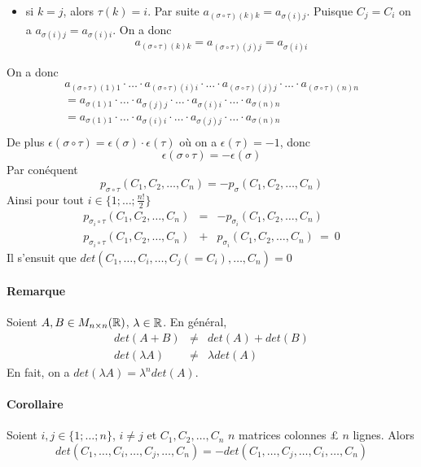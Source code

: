 \begin{enumerate}
\begin{itemize}
      \item si $k = j$, alors $\tau(k) = i$. Par suite $a_{(\sigma \circ \tau)(k) k} = a_{\sigma(i) j}$. Puisque $C_j = C_i$ on a $a_{\sigma(i) j} = a_{\sigma(i) i}$. On a donc
        $$a_{(\sigma \circ \tau)(k) k} = a_{(\sigma \circ \tau)(j) j} = a_{\sigma(i) i}$$
    \end{itemize}
    On a donc
    \begin{eqnarray*}
      a_{(\sigma \circ \tau)(1) 1} \cdot \ldots \cdot a_{(\sigma \circ \tau)(i) i} \cdot \ldots \cdot a_{(\sigma \circ \tau)(j) j} \cdot \ldots \cdot a_{(\sigma \circ \tau)(n) n} \\
        = a_{\sigma(1) 1} \cdot \ldots \cdot a_{\sigma(j) j} \cdot \ldots \cdot a_{\sigma(i) i} \cdot \ldots \cdot a_{\sigma(n) n} \\
        = a_{\sigma(1) 1} \cdot \ldots \cdot a_{\sigma(i) i} \cdot \ldots \cdot a_{\sigma(j) j} \cdot \ldots \cdot a_{\sigma(n) n} \\
    \end{eqnarray*}
    De plus $\epsilon(\sigma \circ \tau) = \epsilon(\sigma) \cdot \epsilon(\tau)$ où on a $\epsilon(\tau) = -1$, donc
    $$\epsilon(\sigma \circ \tau) = -\epsilon(\sigma)$$
    Par conéquent 
    $$p_{\sigma \circ \tau}(C_1, C_2, \ldots, C_n) = -p_{\sigma}(C_1, C_2, \ldots, C_n)$$
    Ainsi pour tout $i\in \{1; \ldots; \frac{n!}{2}\}$
    \begin{eqnarray*}
      p_{\sigma_i \circ \tau}(C_1, C_2, \ldots, C_n) &=& -p_{\sigma_i}(C_1, C_2, \ldots, C_n) \\
      p_{\sigma_i \circ \tau}(C_1, C_2, \ldots, C_n) &+& p_{\sigma_i}(C_1, C_2, \ldots, C_n) ~=~ 0
    \end{eqnarray*}
    Il s'ensuit que $det(C_1, \ldots, C_i, \ldots, C_j(=C_i), \ldots, C_n) = 0$
\end{enumerate}

\paragraph{Remarque} Soient $A, B \in M_{n \times n}(\mathbb{R})$, $\lambda \in \mathbb{R}$. En général,
\begin{eqnarray*}
  det(A + B) &\neq& det(A) + det(B) \\
  det(\lambda A) &\neq& \lambda det(A)
\end{eqnarray*}
En fait, on a $det(\lambda A) = \lambda^{n} det(A)$.

\paragraph{Corollaire} Soient $i, j \in \{1; \ldots; n\}$, $i\neq j$ et $C_1, C_2, \ldots, C_n$ $n$ matrices colonnes £ $n$ lignes. Alors
$$det(C_1, \ldots, C_i, \ldots, C_j, \ldots, C_n) = -det(C_1, \ldots, C_j, \ldots, C_i, \ldots, C_n)$$

